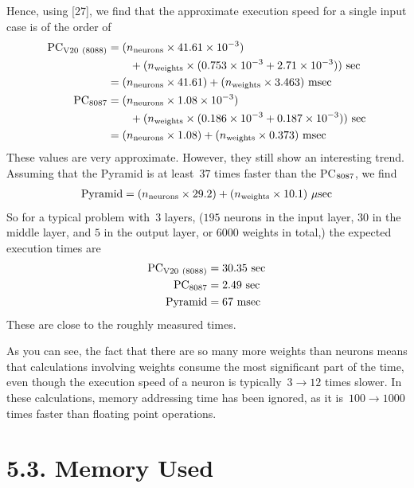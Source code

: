 \documentclass[12pt]{report}
\begin{document}
Hence, using [27], we find that the approximate execution speed for
a single input case is of the order of
$$
\begin{aligned}
{\rm PC}_{\rm V20\ (8088)} &= (n_{\rm neurons} \times 41.61 \times 10^{-3})\\
	&\qquad{}+ (n_{\rm weights} \times (0.753\times 10^{-3} + 
				2.71\times 10^{-3}))
				{\rm\ sec}\\
		   &= (n_{\rm neurons} \times 41.61) + 
	(n_{\rm weights} \times 3.463) {\rm \ msec}\\
{\rm PC}_{\rm 8087} &= (n_{\rm neurons} \times 1.08\times 10^{-3})\\
	&\qquad{}+ (n_{\rm weights} \times (0.186\times 10^{-3} + 0.187\times
		10^{-3})) {\rm\ sec}\\
	      &= (n_{\rm neurons} \times 1.08) +
	(n_{\rm weights} \times 0.373) {\rm \ msec}\\
\end{aligned}$$
These values are very approximate.
However, they still show an interesting trend.
Assuming that the Pyramid is at least~$37$ times 
faster than the PC$_{\rm 8087}$, we find
$$
\begin{aligned}
{\rm Pyramid} &= (n_{\rm neurons} \times 29.2) +
		(n_{\rm weights} \times 10.1){\rm\ }\mu{\rm sec}\\
\end{aligned}
$$
So for a typical problem with~$3$ layers, ($195$ neurons in the input
layer, $30$ in the middle layer, and $5$ in the output layer, or
$6000$ weights in total,) the expected execution times are
$$
\begin{aligned}
{\rm PC}_{\rm V20\ (8088)} &= 30.35 {\rm\ sec}\\
{\rm PC}_{\rm 8087}	    &= 2.49  {\rm\ sec}\\
{\rm Pyramid}	    &= 67    {\rm\ msec}\\
\end{aligned}
$$
These are close to the roughly measured times.

As you can see, the fact that there are so many more weights than
neurons means that calculations involving weights consume the most
significant part of the time, even though the execution speed of a
neuron is typically~$3 \to 12$ times slower.
In these calculations, memory addressing time has been ignored, as
it is~$100 \to 1000$ times faster than floating point operations.

\section{5.3. Memory Used}
\end{document}
